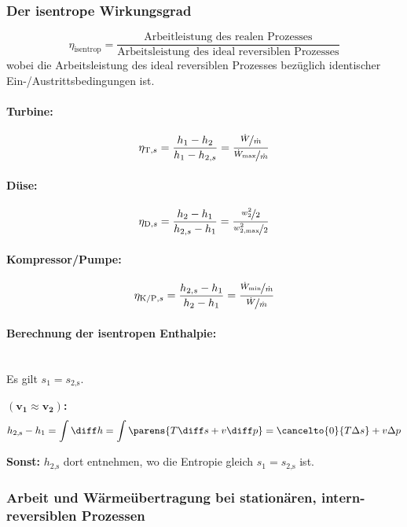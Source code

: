 		\subsubsection{Der isentrope Wirkungsgrad} %
			\[
				\eta_{\text{isentrop}} = \frac{\text{Arbeitleistung des realen Prozesses}}{\text{Arbeitsleistung des ideal reversiblen Prozesses}}
			\]
			wobei die Arbeitsleistung des ideal reversiblen Prozesses bezüglich identischer Ein-/Austrittsbedingungen ist.
			
			\paragraph{Turbine:} %
				\[
					\eta_{\text{T},s} = \frac{h_1 - h_2}{h_1 - h_{2,s}} = \frac{\nicefrac{\dot W}{\dot m}}{\nicefrac{\dot W_{\text{max}}}{\dot m}}
				\]
			\paragraph{Düse:} %
				\[
					\eta_{\text{D},s} = \frac{h_2 - h_1}{h_{2,s} - h_1} = \frac{\nicefrac{w_2^2}{2}}{\nicefrac{w_{2\text{,max}}^2}{2}}
				\]
			\paragraph{Kompressor/Pumpe:} %
				\[
					\eta_{\text{K/P},s} = \frac{h_{2,s} - h_1}{h_2 - h_1} = \frac{\nicefrac{\dot W_{\text{min}}}{\dot m}}{\nicefrac{\dot W}{\dot m}}
				\]
			
			\paragraph{Berechnung der isentropen Enthalpie:}~\\ %
				Es gilt $s_1 = s_\text{$2$,s}$.
				
				\textbf{$\boldsymbol{(v_1 \approx v_2)}$:}
				\[
					h_\text{$2$,s} - h_1 = \int \diff h = \int \parens{ T \diff s + v \diff p} = \cancelto{0}{T\Delta s} + v \Delta p
				\]
				
				\textbf{Sonst:}
				$h_\text{$2$,s}$ dort entnehmen, wo die Entropie gleich $s_1 = s_\text{$2$,s}$ ist.
		
		\subsubsection{Arbeit und Wär\-me\-über\-tra\-gung bei sta\-tio\-nä\-ren, intern-reversiblen Prozessen} %
